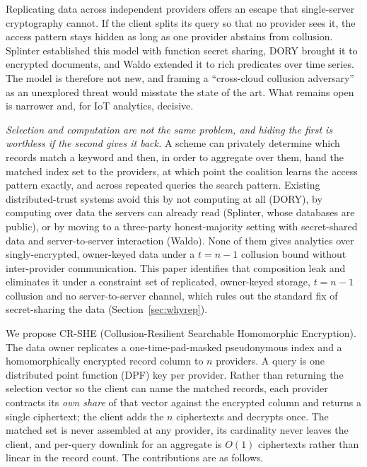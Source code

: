 \documentclass[a4paper,fleqn]{cas-dc}
\begin{document}
Replicating data across independent providers offers an escape that
single-server cryptography cannot. If the client splits its query so that no
provider sees it, the access pattern stays hidden as long as one provider
abstains from collusion. Splinter \citep{splinter} established this model with
function secret sharing, DORY \citep{dory} brought it to encrypted documents,
and Waldo \citep{waldo} extended it to rich predicates over time series. The
model is therefore not new, and framing a ``cross-cloud collusion adversary''
as an unexplored threat would misstate the state of the art. What remains open
is narrower and, for IoT analytics, decisive.

\emph{Selection and computation are not the same problem, and hiding the first
is worthless if the second gives it back.} A scheme can privately determine
which records match a keyword and then, in order to aggregate over them, hand
the matched index set to the providers, at which point the coalition learns
the access pattern exactly, and across repeated queries the search pattern.
Existing distributed-trust systems avoid this by not computing at all (DORY),
by computing over data the servers can already read (Splinter, whose databases
are public), or by moving to a three-party honest-majority setting with
secret-shared data and server-to-server interaction (Waldo). None of them
gives analytics over singly-encrypted, owner-keyed data under a $t=n-1$
collusion bound without inter-provider communication. This paper identifies
that composition leak and eliminates it under a constraint set of replicated,
owner-keyed storage, $t=n-1$ collusion and no server-to-server channel, which
rules out the standard fix of secret-sharing the data
(Section~\ref{sec:whyrep}).

We propose CR-SHE (Collusion-Resilient Searchable Homomorphic Encryption). The
data owner replicates a one-time-pad-masked pseudonymous index and a
homomorphically encrypted record column to $n$ providers. A query is one
distributed point function (DPF) key per provider. Rather than returning the
selection vector so the client can name the matched records, each provider
contracts its \emph{own share} of that vector against the encrypted column and
returns a single ciphertext; the client adds the $n$ ciphertexts and decrypts
once. The matched set is never assembled at any provider, its cardinality
never leaves the client, and per-query downlink for an aggregate is $O(1)$
ciphertexts rather than linear in the record count. The contributions are as
follows.
\end{document}

